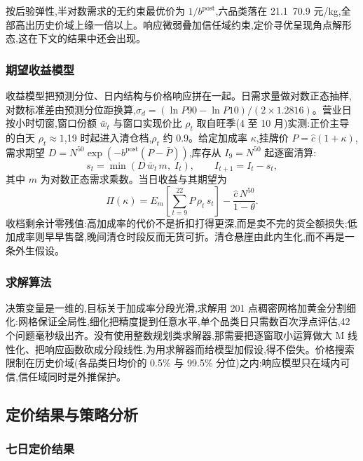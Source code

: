 按后验弹性,半对数需求的无约束最优价为 $1/b^{\mathrm{post}}$,六品类落在 21.1~70.9 元/kg,全部高出历史价域上缘一倍以上。响应微弱叠加信任域约束,定价寻优呈现角点解形态,这在下文的结果中还会出现。

\subsubsection{期望收益模型}

收益模型把预测分位、日内结构与价格响应拼在一起。日需求量做对数正态抽样,对数标准差由预测分位距换算,$\sigma_d=(\ln P90-\ln P10)/(2\times1.2816)$。营业日按小时切窗,窗口份额 $\bar{w}_t$ 与窗口实现价比 $\rho_t$ 取自旺季(4 至 10 月)实测:正价主导的白天 $\rho_t\approx1$,19 时起进入清仓档,$\rho_t$ 约 0.9。给定加成率 $\kappa$,挂牌价 $P=\hat{c}(1+\kappa)$,需求期望 $D=N^{50}\exp(-b^{\mathrm{post}}(P-\bar{P}))$,库存从 $I_9=N^{50}$ 起逐窗清算:
\begin{equation}
  s_t=\min\left(D\,\bar{w}_t\,m,\; I_t\right),\qquad I_{t+1}=I_t-s_t,
  \label{eq:clear}
\end{equation}
其中 $m$ 为对数正态需求乘数。当日收益与其期望为
\begin{equation}
  \Pi(\kappa)=E_{m}\!\left[\sum_{t=9}^{22}P\,\rho_t\,s_t\right]
  -\frac{\hat{c}\,N^{50}}{1-\theta}.
  \label{eq:profit}
\end{equation}
收档剩余计零残值:高加成率的代价不是折扣打得更深,而是卖不完的货全额损失;低加成率则早早售罄,晚间清仓时段反而无货可折。清仓悬崖由此内生化,而不再是一条外生假设。

\subsubsection{求解算法}

决策变量是一维的,目标关于加成率分段光滑,求解用 201 点稠密网格加黄金分割细化:网格保证全局性,细化把精度提到任意水平,单个品类日只需数百次浮点评估,42 个问题毫秒级出齐。没有使用整数规划类求解器,那需要把逐窗取小运算做大 M 线性化、把响应函数砍成分段线性,为用求解器而给模型加假设,得不偿失。价格搜索限制在历史价域(各品类日均价的 0.5\% 与 99.5\% 分位)之内:响应模型只在域内可信,信任域同时是外推保护。

\subsection{定价结果与策略分析}

\subsubsection{七日定价结果}

